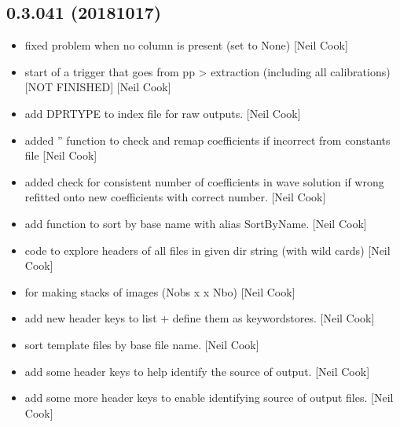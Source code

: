 \documentclass[a4paper,10pt,english]{report}
\begin{document}
\subsection{0.3.041 (2018\sphinxhyphen{}10\sphinxhyphen{}17)}
\label{\detokenize{misc/changelog:id310}}\begin{itemize}
\item {} 
 \sphinxhyphen{} fixed problem when no column is present (set to
None) {[}Neil Cook{]}

\item {} 
 \sphinxhyphen{} start of a trigger that goes from pp \textendash{}\textgreater{}
extraction (including all calibrations) \sphinxhyphen{} {[}NOT FINISHED{]} {[}Neil Cook{]}

\item {} 
 \sphinxhyphen{} add DPRTYPE to index file for raw outputs. {[}Neil
Cook{]}

\item {} 
 \sphinxhyphen{} added ” function to check
and remap coefficients if incorrect from constants file
 {[}Neil Cook{]}

\item {} 
  \sphinxhyphen{} added check for consistent number of coefficients
in wave solution \sphinxhyphen{} if wrong refitted onto new coefficients with
correct number. {[}Neil Cook{]}

\item {} 
 \sphinxhyphen{} add function to sort by base name  with
alias SortByName. {[}Neil Cook{]}

\item {} 
 \sphinxhyphen{} code to explore headers of all files in given dir
string (with wild cards) {[}Neil Cook{]}

\item {} 
 \sphinxhyphen{} for making stacks of images (Nobs x  x
Nbo) {[}Neil Cook{]}

\item {} 
 \sphinxhyphen{} add new header keys to list + define them as
keywordstores. {[}Neil Cook{]}

\item {} 
 \sphinxhyphen{} sort template files by base file name. {[}Neil
Cook{]}

\item {} 
 \sphinxhyphen{} add some header keys to help identify the
source of output. {[}Neil Cook{]}

\item {} 
 \sphinxhyphen{} add some more header keys to enable
identifying source of output files. {[}Neil Cook{]}

\end{itemize}
\end{document}
